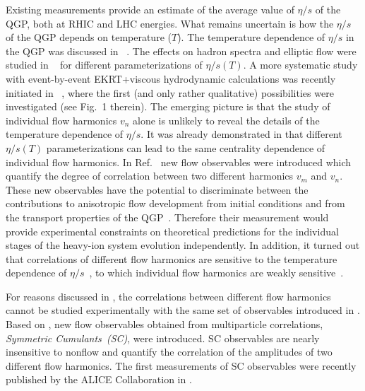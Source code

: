 Existing measurements provide an estimate of the average value of $\eta/s$ of the QGP, both at RHIC and LHC energies. What remains uncertain is how the $\eta/s$ of the QGP depends on temperature ($T$). The temperature dependence of $\eta/s$ in the QGP was discussed in ~\cite{Csernai:2006zz}. The effects on hadron spectra and elliptic flow were studied in ~\cite{Niemi:2011ix} for different parameterizations of $\eta/s(T)$.  A more systematic study with event-by-event EKRT+viscous hydrodynamic calculations was recently initiated in ~\cite{Niemi:2015qia}, where the first (and only rather qualitative) possibilities were investigated (see Fig.~1 therein). The emerging picture is that the study of individual flow harmonics $v_n$ alone is unlikely to reveal the details of the temperature dependence of $\eta/s$.
It was already demonstrated in \cite{Niemi:2015qia} that different $\eta/s(T)$ parameterizations can lead to the same centrality dependence of individual flow harmonics. In Ref.~\cite{Niemi:2012aj} new flow observables were introduced which quantify the degree of correlation between two different harmonics $v_m$ and $v_n$. These new observables have the potential to discriminate between the contributions to anisotropic flow development from initial conditions and from the transport properties of the QGP~\cite{Niemi:2012aj}. Therefore their measurement would provide experimental constraints on theoretical predictions for the individual stages of the heavy-ion system evolution independently. In addition, it turned out that correlations of different flow harmonics are sensitive to the temperature dependence of $\eta/s$~\cite{ALICE:2016kpq}, to which individual flow harmonics are weakly sensitive~\cite{Niemi:2015qia}. 
 
For reasons discussed in \cite{ALICE:2016kpq,Bilandzic:2013kga}, the correlations between different flow harmonics cannot be studied experimentally with the same set of observables introduced in \cite{Niemi:2012aj}. 
Based on \cite{Bilandzic:2013kga}, new flow observables obtained from multiparticle correlations, \textit{Symmetric Cumulants~(SC)}, were introduced. SC observables are nearly insensitive to nonflow and quantify the correlation of the amplitudes of two different flow harmonics.
The first measurements of SC observables were recently published by the ALICE Collaboration in \cite{ALICE:2016kpq}.

